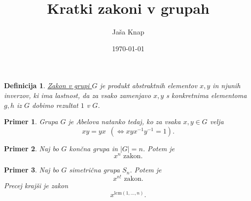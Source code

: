 \documentclass{beamer}
\title{Kratki zakoni v grupah}
\author{Jaša Knap}
\institute{Fakulteta za matematiko in fiziko \\
Oddelek za matematiko}
\date{\today}
\newtheorem{definicija}{Definicija}
\newtheorem{primer}{Primer}
\begin{document}

\begin{frame}
\titlepage
\end{frame}


\begin{frame}
\begin{definicija}
    \underline{Zakon v grupi $G$} je produkt abstraktnih elementov $x,y$ in njunih inverzov, ki ima lastnost, da za vsako zamenjavo $x,y$
    s konkretnima elementoma $g,h$ iz $G$ dobimo rezultat $1$ v $G$.
\end{definicija}

\begin{primer}
Grupa $G$ je Abelova natanko tedaj, ko za vsaka $x,y \in G$ velja \begin{equation*}
xy = yx \,\,\,(\iff xyx^{-1}y^{-1} = 1).
\end{equation*}  
  
\end{primer}
\end{frame}    

\begin{frame}
    \begin{primer}
    Naj bo $G$ končna grupa in $\lvert G \rvert = n$. Potem je \begin{equation*}
    x^{n} \text{ zakon.}
    \end{equation*}  
    \end{primer}

    \pause[]

    \begin{primer}
    Naj bo $G$ simetrična grupa $S_n$. Potem je \begin{equation*}
        x^{n!} \text{ zakon.}
    \end{equation*}  
    Precej krajši je zakon \begin{equation*}
        x^{\text{lcm}(1, \ldots, n)}.
    \end{equation*}  
      
    \end{primer}
    
    
\end{frame}
\end{document}
